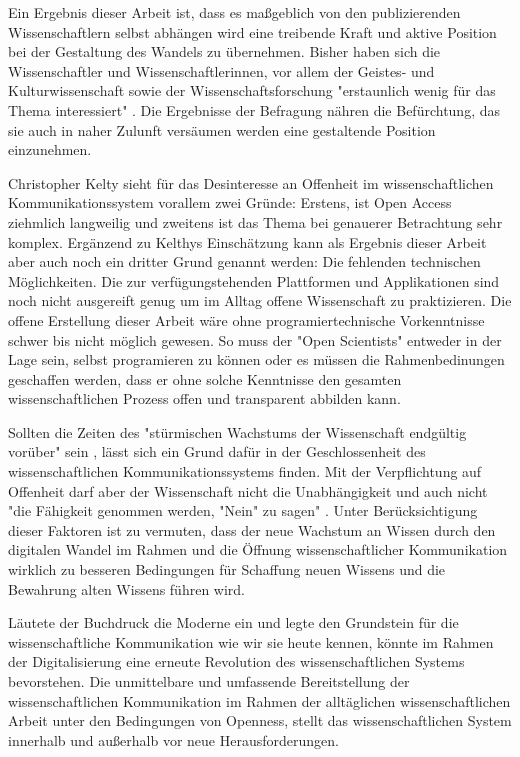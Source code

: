 Ein Ergebnis dieser Arbeit ist, dass es maßgeblich von den publizierenden Wissenschaftlern selbst abhängen wird eine treibende Kraft und aktive Position bei der Gestaltung des Wandels zu übernehmen. Bisher haben sich die Wissenschaftler und Wissenschaftlerinnen, vor allem der Geistes- und Kulturwissenschaft sowie der Wissenschaftsforschung "erstaunlich wenig für das Thema interessiert" \cite{hagner_2015_sache_buches}. Die Ergebnisse der Befragung nähren die Befürchtung, das sie auch in naher Zulunft versäumen werden eine gestaltende Position einzunehmen.

Christopher Kelty sieht für das Desinteresse an Offenheit im wissenschaftlichen Kommunikationssystem vorallem zwei Gründe: Erstens, ist Open Access ziehmlich langweilig und zweitens ist das Thema bei genauerer Betrachtung sehr komplex. Ergänzend zu Kelthys Einschätzung kann als Ergebnis dieser Arbeit aber auch noch ein dritter Grund genannt werden: Die fehlenden technischen Möglichkeiten. Die zur verfügungstehenden Plattformen und Applikationen sind noch nicht ausgereift genug um im Alltag offene Wissenschaft zu praktizieren. Die offene Erstellung dieser Arbeit wäre ohne programiertechnische Vorkenntnisse schwer bis nicht möglich gewesen. So muss der "Open Scientists" entweder in der Lage sein, selbst programieren zu können oder es müssen die Rahmenbedinungen geschaffen werden, dass er ohne solche Kenntnisse den gesamten wissenschaftlichen Prozess offen und transparent abbilden kann.

Sollten die Zeiten des "stürmischen Wachstums der Wissenschaft endgültig vorüber" sein \cite{K_lbel_2002}, lässt sich ein Grund dafür in der Geschlossenheit des wissenschaftlichen Kommunikationssystems finden. Mit der Verpflichtung auf Offenheit darf aber der Wissenschaft nicht die Unabhängigkeit und auch nicht "die Fähigkeit genommen werden, "Nein" zu sagen" \cite{suchen_Hornbostel_2006}. Unter Berücksichtigung dieser Faktoren ist zu vermuten, dass der neue Wachstum an Wissen durch den digitalen Wandel im Rahmen und die Öffnung wissenschaftlicher Kommunikation wirklich zu besseren Bedingungen für Schaffung neuen Wissens und die Bewahrung alten Wissens führen wird.

Läutete der Buchdruck die Moderne ein und legte den Grundstein für die wissenschaftliche Kommunikation wie wir sie heute kennen, könnte im Rahmen der Digitalisierung eine erneute Revolution des wissenschaftlichen Systems bevorstehen. Die unmittelbare und umfassende Bereitstellung der wissenschaftlichen Kommunikation im Rahmen der alltäglichen wissenschaftlichen Arbeit unter den Bedingungen von Openness, stellt das wissenschaftlichen System innerhalb und außerhalb vor neue Herausforderungen.

